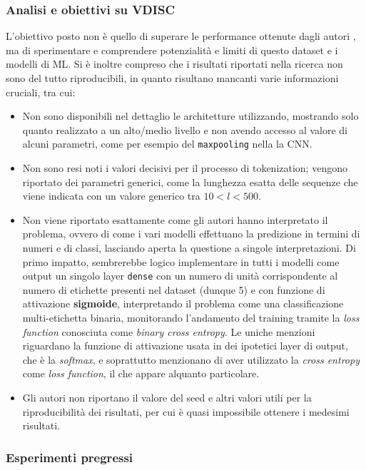 \documentclass[conference]{IEEEtran}
\begin{document}
\subsubsection{Analisi e obiettivi su VDISC}
L'obiettivo posto non è quello di superare le performance ottenute dagli autori \cite{russell2018automatedvulnerabilitydetectionsource}, ma di sperimentare e comprendere potenzialità e limiti di questo dataset e i modelli di ML. Si è inoltre compreso che i risultati riportati nella ricerca non sono del tutto riproducibili, in quanto risultano mancanti varie informazioni cruciali, tra cui: 
\begin{itemize}
    \item Non sono disponibili nel dettaglio le architetture utilizzando, mostrando solo quanto realizzato a un alto/medio livello e non avendo accesso al valore di alcuni parametri, come per esempio del \texttt{maxpooling} nella la CNN.
    \item Non sono resi noti i valori decisivi per il processo di tokenization; vengono riportato dei parametri generici, come la lunghezza esatta delle sequenze che viene indicata con un valore generico tra $10 < l < 500$.
    \item Non viene riportato esattamente come gli autori hanno interpretato il problema, ovvero di come i vari modelli effettuano la predizione in termini di numeri e di classi, lasciando aperta la questione a singole interpretazioni. 
    Di primo impatto, sembrerebbe logico implementare in tutti i modelli come output un singolo layer \texttt{dense} con un numero di unità corrispondente al numero di etichette presenti nel dataset (dunque 5) e con funzione di attivazione \textbf{sigmoide}, interpretando il problema come una classificazione multi-etichetta binaria, monitorando l'andamento del training tramite la \textit{loss function} conosciuta come \textit{binary cross entropy}. Le uniche menzioni riguardano la funzione di attivazione usata in dei ipotetici layer di output, che è la \textit{softmax}, e soprattutto menzionano di aver utilizzato la \textit{cross entropy} come \textit{loss function}, il che appare alquanto particolare.
    \item Gli autori non riportano il valore del seed e altri valori utili per la riproducibilità dei risultati, per cui è quasi impossibile ottenere i medesimi risultati.
\end{itemize}


\subsubsection{Esperimenti pregressi}
\end{document}
